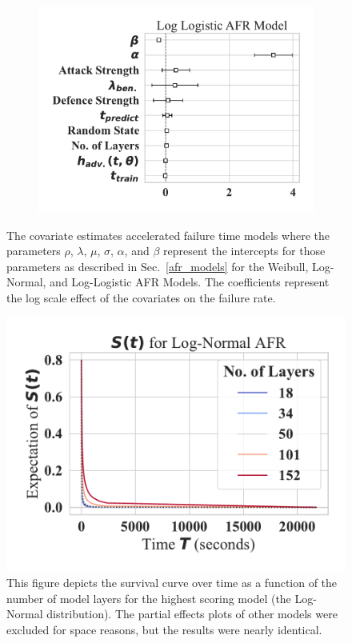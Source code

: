 \begin{figure}
\begin{subfigure}{0.32\textwidth}
        \includegraphics[width=\textwidth]{cifar/log_logistic_aft.pdf}
    \end{subfigure}
    
    \caption{The covariate estimates accelerated failure time models where the parameters $\rho$, $\lambda$, $\mu$, $\sigma$, $\alpha$, and $\beta$ represent the intercepts for those parameters as described in Sec.~\ref{afr_models} for the Weibull, Log-Normal, and Log-Logistic AFR Models. The coefficients represent the log scale effect of the covariates on the failure rate.}
    \label{fig:afr_models}
\end{figure}

% 
\begin{figure}
    \centering\includegraphics[width=.5\textwidth]{cifar/log_normal_partial_effects.pdf}
   \caption{This figure depicts the survival curve over time as a function of the number of model layers for the highest scoring model (the Log-Normal distribution). The partial effects plots of other models were excluded for space reasons, but the results were nearly identical.}
    \label{fig:layers}
\end{figure}
% 



